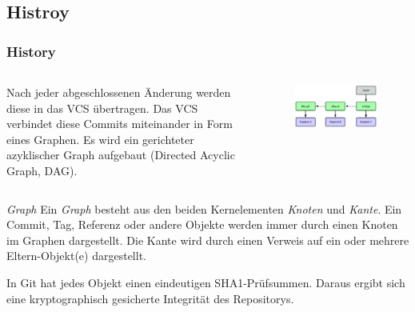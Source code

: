 \documentclass{beamer}
\begin{document}
\subsection{Histroy}

\begin{frame}\frametitle{History}
\begin{columns}
Nach jeder abgeschlossenen Änderung werden diese in das VCS übertragen. Das VCS verbindet diese Commits miteinander in Form eines Graphen. Es wird ein gerichteter azyklischer Graph aufgebaut (Directed Acyclic Graph, DAG). 
		\begin{figure}
		\includegraphics[scale=0.30]{Bilder/graph} 
\end{figure}
\end{columns}

\begin{block}{\textit{Graph}}
Ein \textit{Graph} besteht aus den beiden Kernelementen \textit{Knoten} und \textit{Kante}. Ein Commit, Tag, Referenz oder andere Objekte werden immer durch einen Knoten im Graphen dargestellt. Die Kante wird durch einen Verweis auf ein oder mehrere Eltern-Objekt(e) dargestellt. 
\end{block}

In Git hat jedes Objekt einen eindeutigen SHA1-Prüfsummen. Daraus ergibt sich eine kryptographisch gesicherte Integrität des Repositorys. 

\end{frame}
\end{document}
